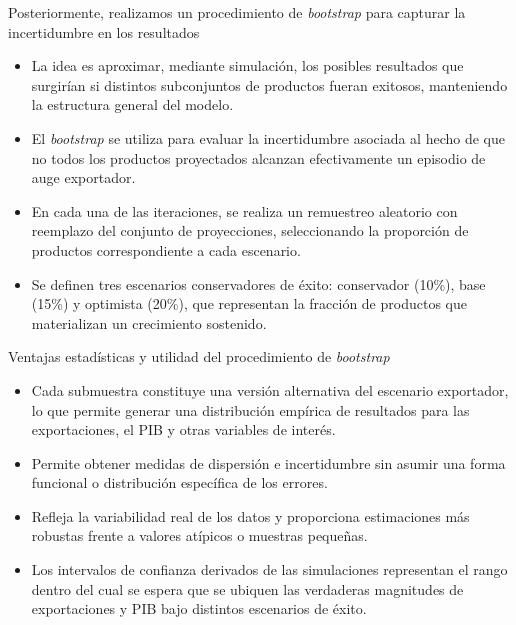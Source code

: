\documentclass[aspectratio=169,xcolor=dvipsnames]{beamer}
\begin{document}
\begin{frame}{Posteriormente, realizamos un procedimiento de \textit{bootstrap} para capturar la incertidumbre en los resultados}
    \begin{itemize}
        \item La idea es aproximar, mediante simulación, los posibles resultados que surgirían si distintos subconjuntos de productos fueran exitosos, manteniendo la estructura general del modelo.
        \item El \textit{bootstrap} se utiliza para evaluar la incertidumbre asociada al hecho de que no todos los productos proyectados alcanzan efectivamente un episodio de auge exportador.  
        \item En cada una de las iteraciones, se realiza un remuestreo aleatorio con reemplazo del conjunto de proyecciones, seleccionando la proporción de productos correspondiente a cada escenario.
        \item Se definen tres escenarios conservadores de éxito: conservador (10\%), base (15\%) y optimista (20\%), que representan la fracción de productos que materializan un crecimiento sostenido.
    \end{itemize}
\end{frame}

\begin{frame}{Ventajas estadísticas y utilidad del procedimiento de \textit{bootstrap}}
    \begin{itemize}
        \item Cada submuestra constituye una versión alternativa del escenario exportador, lo que permite generar una distribución empírica de resultados para las exportaciones, el PIB y otras variables de interés.
        \item Permite obtener medidas de dispersión e incertidumbre sin asumir una forma funcional o distribución específica de los errores.
        \item Refleja la variabilidad real de los datos y proporciona estimaciones más robustas frente a valores atípicos o muestras pequeñas.
        \item Los intervalos de confianza derivados de las simulaciones representan el rango dentro del cual se espera que se ubiquen las verdaderas magnitudes de exportaciones y PIB bajo distintos escenarios de éxito.
    \end{itemize}
\end{frame}
\end{document}
